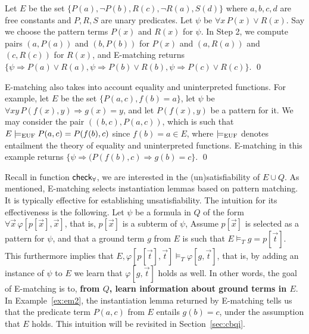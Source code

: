 \documentclass[oribibl]{llncs}
\begin{document}
\begin{example}
\label{ex:em2}
Let $E$ be the set $\{ P(a), \neg P(b), R(c), \neg R(a), S(d) \}$ where $a,b,c,d$ are free constants and $P,R,S$ are unary predicates.
Let $\psi$ be $\forall x\, P( x ) \vee R( x )$.
Say we choose the pattern terms $P( x )$ and $R( x )$ for $\psi$.
In Step 2, we compute pairs $( a, P( a ) )$ and $( b, P( b ) )$ for $P( x )$ and
$( a, R( a ) )$ and $( c, R( c ) )$ for $R( x )$,
and E-matching returns $\{
\psi \Rightarrow P( a ) \vee R( a ), \psi \Rightarrow P( b ) \vee R( b ), \psi \Rightarrow P( c ) \vee R( c )
\}$.
\qed
\end{example}

\begin{example}
\label{ex:em2}
E-matching also takes into account equality and uninterpreted functions.
For example, let $E$ be the set $\{ P( a, c ), f( b ) = a \}$,
let $\psi$ be $\forall xy\, P( f( x ), y ) \Rightarrow g( x ) = y$,
and let $P( f( x ), y )$ be a pattern for it.
We may consider the pair $( ( b, c ), P( a, c ) )$, which is such that $E \models_\mathrm{EUF} P( a, c ) = P( f( b ), c )$ since $f( b ) = a \in E$,
where $\models_\mathrm{EUF}$ denotes entailment the theory of equality and uninterpreted functions.
E-matching in this example returns $\{ \psi \Rightarrow ( P( f( b ), c ) \Rightarrow g( b ) = c \}$.
\qed
\end{example}

Recall in function $\small\mathsf{check}_\forall$, we are interested in the (un)satisfiability of $E \cup Q$.
As mentioned, E-matching selects instantiation lemmas based on pattern matching.
It is typically effective for establishing unsatisfiability.
The intuition for its effectiveness is the following. 
Let $\psi$ be a formula in $Q$ of the form $\forall \vec x\, \varphi[ p[ \vec x ], \vec x ]$, 
that is, $p[ \vec x ]$ is a subterm of $\psi$,
Assume $p[ \vec x ]$ is selected as a pattern for $\psi$, and
that a ground term $g$ from $E$ is such that $E \models_T g = p[ \vec t ]$.
This furthermore implies that $E, \varphi[ p[ \vec t ], \vec t ] \models_T \varphi[ g, \vec t ]$,
that is, by adding an instance of $\psi$ to $E$ we learn that $\varphi[ g, \vec t ]$ holds as well.
In other words, 
the goal of E-matching is to, {\bf from $Q$, learn information about ground terms in $E$}.
In Example~\ref{ex:em2}, the instantiation lemma returned by E-matching tells us
that the predicate term $P( a, c )$ from $E$ entails $g( b ) = c$, under the assumption that $E$ holds.
This intuition will be revisited in Section~\ref{sec:cbqi}.
\end{document}
